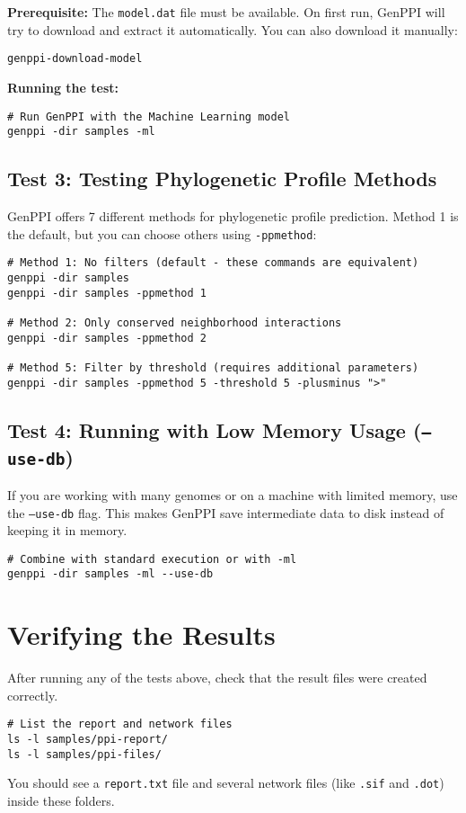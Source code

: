 \documentclass[11pt, a4paper]{article}
\begin{document}
\textbf{Prerequisite:} The \texttt{model.dat} file must be available. On first run, GenPPI will try to download and extract it automatically. You can also download it manually:
\begin{lstlisting}[style=bashstyle]
genppi-download-model
\end{lstlisting}
\textbf{Running the test:}
\begin{lstlisting}[style=bashstyle]
# Run GenPPI with the Machine Learning model
genppi -dir samples -ml
\end{lstlisting}

\subsection{Test 3: Testing Phylogenetic Profile Methods}
GenPPI offers 7 different methods for phylogenetic profile prediction. Method 1 is the default, but you can choose others using \texttt{-ppmethod}:
\begin{lstlisting}[style=bashstyle]
# Method 1: No filters (default - these commands are equivalent)
genppi -dir samples
genppi -dir samples -ppmethod 1

# Method 2: Only conserved neighborhood interactions
genppi -dir samples -ppmethod 2

# Method 5: Filter by threshold (requires additional parameters)
genppi -dir samples -ppmethod 5 -threshold 5 -plusminus ">"
\end{lstlisting}

\subsection{Test 4: Running with Low Memory Usage (\texttt{--use-db})}
If you are working with many genomes or on a machine with limited memory, use the \texttt{--use-db} flag. This makes GenPPI save intermediate data to disk instead of keeping it in memory.
\begin{lstlisting}[style=bashstyle]
# Combine with standard execution or with -ml
genppi -dir samples -ml --use-db
\end{lstlisting}

\section{Verifying the Results}
After running any of the tests above, check that the result files were created correctly.
\begin{lstlisting}[style=bashstyle]
# List the report and network files
ls -l samples/ppi-report/
ls -l samples/ppi-files/
\end{lstlisting}
You should see a \texttt{report.txt} file and several network files (like \texttt{.sif} and \texttt{.dot}) inside these folders.
\end{document}
